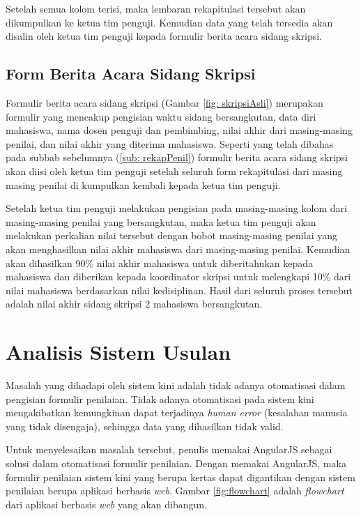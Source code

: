 	Setelah semua kolom terisi, maka lembaran rekapitulasi tersebut akan dikumpulkan ke ketua tim penguji. Kemudian data yang telah tersedia akan disalin oleh ketua tim penguji kepada formulir berita acara sidang skripsi.
	
	\subsection{Form Berita Acara Sidang Skripsi}
	\label{sub: formSkripsi}
	
	Formulir berita acara sidang skripsi (Gambar \ref{fig: skripsiAsli}) merupakan formulir yang mencakup pengisian waktu sidang bersangkutan, data diri mahasiswa, nama dosen penguji dan pembimbing, nilai akhir dari masing-masing penilai, dan nilai akhir yang diterima mahasiswa. Seperti yang telah dibahas pada subbab sebelumnya (\ref{sub: rekapPenil}) formulir berita acara sidang skripsi akan diisi oleh ketua tim penguji setelah seluruh form rekapitulasi dari masing masing penilai di kumpulkan kembali kepada ketua tim penguji.
	
	Setelah ketua tim penguji melakukan pengisian pada masing-masing kolom dari masing-masing penilai yang bersangkutan, maka ketua tim penguji akan melakukan perkalian nilai tersebut dengan bobot masing-masing penilai yang akan menghasilkan nilai akhir mahasiswa dari masing-masing penilai. Kemudian akan dihasilkan 90\% nilai akhir mahasiswa untuk diberitahukan kepada mahasiswa dan diberikan kepada koordinator skripsi untuk melengkapi 10\% dari nilai mahasiswa berdasarkan nilai kedisiplinan. Hasil dari seluruh proses tersebut adalah nilai akhir sidang skripsi 2 mahasiswa bersangkutan.
	
\section{Analisis Sistem Usulan}
\label{sec: analisisSUsulan}

Masalah yang dihadapi oleh sistem kini adalah tidak adanya otomatisasi dalam pengisian formulir penilaian. Tidak adanya otomatisasi pada sistem kini mengakibatkan kemungkinan dapat terjadinya \textit{human error} (kesalahan manusia yang tidak disengaja), sehingga data yang dihasilkan tidak valid.

Untuk menyelesaikan masalah tersebut, penulis memakai AngularJS sebagai solusi dalam otomatisasi formulir penilaian. Dengan memakai AngularJS, maka formulir penilaian sistem kini yang berupa kertas dapat digantikan dengan sistem penilaian berupa aplikasi berbasis \textit{web}. Gambar \ref{fig:flowchart} adalah \textit{flowchart} dari aplikasi berbasis \textit{web} yang akan dibangun.

